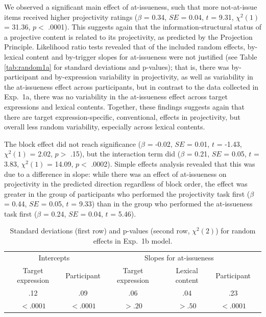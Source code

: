 \documentclass[11pt,fleqn]{article}
\newcommand{\6}{\mbox{$[\hspace*{-.6mm}[$}}
\newcommand{\9}{\mbox{$]\hspace*{-.6mm}]$}}
\newcommand{\tableref}[1]{Table \ref{#1}}
\begin{document}
We observed a significant main effect of at-issueness, such that more not-at-issue items received higher projectivity ratings ($\beta$ = 0.34, $SE$ = 0.04, $t$ = 9.31, $\chi^2(1)$ = 31.36, $p <$ .0001). This suggests again that the information-structural status of a projective content is related to its projectivity, as predicted by the Projection Principle. Likelihood ratio tests revealed that of the included random effects, by-lexical content and by-trigger slopes for at-issueness were not justified (see \tableref{tab:random1a} for standard deviations and p-values); that is, there was by-participant and by-expression variability in projectivity, as well as variability in the at-issueness effect across participants, but in contrast to the data collected in Exp.~1a, there was no variability in the at-issueness effect across target expressions and lexical contents. Together, these findings suggests again that there are target expression-specific, conventional, effects in projectivity, but overall less random variability, especially across lexical contents. 

The block effect did not reach significance ($\beta$ = -0.02, $SE$ = 0.01, $t$ = -1.43, $\chi^2(1)$ = 2.02, $p >$ .15), but the interaction term did ($\beta$ = 0.21, $SE$ = 0.05, $t$ = 3.83, $\chi^2(1)$ = 14.09, $p <$ .0002). Simple effects analysis revealed that this was due to a difference in slope: while there was an effect of at-issueness on projectivity in the predicted direction regardless of block order, the effect was greater in the group of participants who performed the projectivity task first ($\beta$ = 0.44, $SE$ = 0.05, $t$ = 9.33) than in the group who performed the at-issueness task first ($\beta$ = 0.24, $SE$ = 0.04, $t$ = 5.46).


\begin{table}
\begin{center}
\begin{tabular}{c c c c c c }
\toprule
\multicolumn{2}{c}{Intercepts} & \multicolumn{3}{c}{Slopes for at-issueness}\\
Target expression & Participant & Target expression & Lexical content & Participant\\
\midrule
.12 & .09 & .06 & .04 & .23\\
$< .0001$ & $< .0001$ & $> .20$ & $> .50$ & $< .0001$ \\
\bottomrule
\end{tabular}
\caption{Standard deviations (first row) and p-values (second row, $\chi^2(2)$) for random effects in Exp.~1b model.}\label{tab:random1b}
\end{center}
\end{table}
\end{document}
